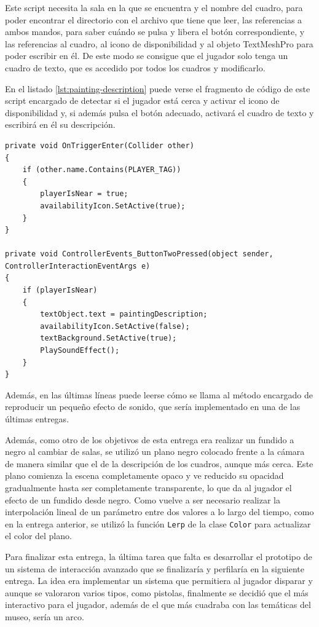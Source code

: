 Este script necesita la sala en la que se encuentra y el nombre del cuadro, para poder encontrar el directorio con el archivo que tiene que leer, las referencias a ambos mandos, para saber cuándo se pulsa y libera el botón correspondiente, y las referencias al cuadro, al icono de disponibilidad y al objeto TextMeshPro para poder escribir en él. De este modo se consigue que el jugador solo tenga un cuadro de texto, que es accedido por todos los cuadros y modificarlo.

En el listado \ref{lst:painting-description} puede verse el fragmento de código de este script encargado de detectar si el jugador está cerca y activar el icono de disponibilidad y, si además pulsa el botón adecuado, activará el cuadro de texto y escribirá en él su descripción.

\begin{lstlisting}[caption=Fragmento del script para activar la descripción de los cuadros, label=lst:painting-description]
private void OnTriggerEnter(Collider other)
{
    if (other.name.Contains(PLAYER_TAG))
    {
        playerIsNear = true;
        availabilityIcon.SetActive(true);
    }
}
    
private void ControllerEvents_ButtonTwoPressed(object sender, ControllerInteractionEventArgs e)
{
    if (playerIsNear)
    {
        textObject.text = paintingDescription;
        availabilityIcon.SetActive(false);
        textBackground.SetActive(true);
        PlaySoundEffect();
    }
}
\end{lstlisting}

Además, en las últimas líneas puede leerse cómo se llama al método encargado de reproducir un pequeño efecto de sonido, que sería implementado en una de las últimas entregas.

Además, como otro de los objetivos de esta entrega era realizar un fundido a negro al cambiar de salas, se utilizó un plano negro colocado frente a la cámara de manera similar que el de la descripción de los cuadros, aunque más cerca. Este plano comienza la escena completamente opaco y ve reducido su opacidad gradualmente hasta ser completamente transparente, lo que da al jugador el efecto de un fundido desde negro. Como vuelve a ser necesario realizar la interpolación lineal de un parámetro entre dos valores a lo largo del tiempo, como en la entrega anterior, se utilizó la función \texttt{Lerp} de la clase \texttt{Color} para actualizar el color del plano.

Para finalizar esta entrega, la última tarea que falta es desarrollar el prototipo de un sistema de interacción avanzado que se finalizaría y perfilaría en la siguiente entrega. La idea era implementar un sistema que permitiera al jugador disparar y aunque se valoraron varios tipos, como pistolas, finalmente se decidió que el más interactivo para el jugador, además de el que más cuadraba con las temáticas del museo, sería un arco.

